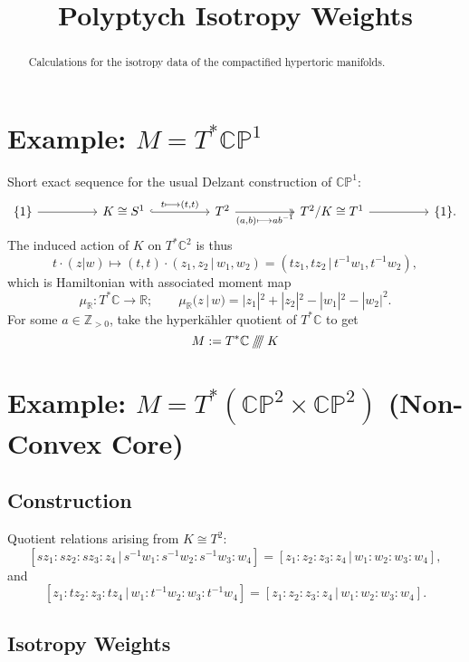\documentclass{article}
\title{Polyptych Isotropy Weights}
\date{}	%
\newcommand{\lra}{\longrightarrow}
\newcommand{\HK}{hyperk\"ahler }
\newcommand{\PP}{\mathbb{P}}
\newcommand{\RR}{\mathbb{R}}
\newcommand{\CC}{\mathbb{C}}
\newcommand{\ZZ}{\mathbb{Z}}
\newcommand{\sssslash}{\mathbin{/\mkern-6mu/\mkern-6mu/\mkern-6mu/}}
\begin{document}
	\maketitle
	
	\begin{abstract}
		Calculations for the isotropy data of the compactified hypertoric manifolds.
	\end{abstract}
	
	\section{Example: $M = T^{\ast}\CC\PP^{1}$}
	
	Short exact sequence for the usual Delzant construction of $\CC\PP^{1}$:
	\[
		\begin{tikzcd}
				\{1\} \arrow[rr] &  & K \cong S^{1} \arrow[rr, "{t \longmapsto (t,t)}", hook] &  & T^{2} \arrow[rr, "{(a,b) \longmapsto ab^{-1}}"', two heads] &  & T^{2}/K \cong T^{1} \arrow[rr] &  & \{1\}.
		\end{tikzcd}
	\]
	The induced action of $K$ on $T^{\ast}\CC^{2}$ is thus
	\[
		t \cdot (z|w) \longmapsto (t, t) \cdot (z_{1}, z_{2}\, |\, w_{1}, w_{2}) = (t z_{1}, t z_{2}\, |\, t^{-1} w_{1}, t^{-1} w_{2}),
	\]
	which is Hamiltonian with associated moment map
	\[
		\mu_{\RR} : T^{\ast}\CC \lra \RR; \qquad  \mu_{\RR}(z\, |\, w) = |z_{1}|^{2} + |z_{2}|^{2} - |w_{1}|^{2} - |w_{2}|^{2}.
	\]
	For some $a \in \ZZ_{>0}$, take the \HK quotient of $T^{\ast}\CC$ to get
	\[
		M := T^{\ast}\CC \sssslash K
	\]

	\section{Example: $M = T^{\ast}(\CC\PP^{2} \times \CC\PP^{2})$ (Non-Convex Core)}
	
	\subsection{Construction}
	
	Quotient relations arising from $K \cong T^{2}$:
	\[
		[sz_{1} : sz_{2} : sz_{3} : z_{4} \, | \, s^{-1}w_{1} : s^{-1}w_{2} : s^{-1}w_{3} : w_{4}] = [z_{1} : z_{2} : z_{3} : z_{4} \, | \, w_{1} : w_{2} : w_{3} : w_{4} ],
	\]
	and
	\[
		[z_{1} : tz_{2} : z_{3} : tz_{4} \, | \, w_{1} : t^{-1}w_{2} : w_{3} : t^{-1}w_{4}] = [z_{1} : z_{2} : z_{3} : z_{4} \, | \, w_{1} : w_{2} : w_{3} : w_{4} ].
	\]
	
	\subsection{Isotropy Weights}
	
\end{document}
